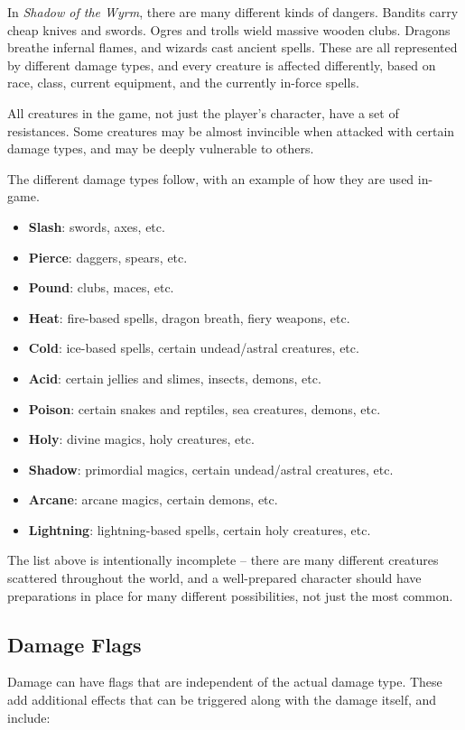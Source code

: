 In {\it Shadow of the Wyrm}, there are many different kinds of dangers.  
Bandits carry cheap knives and swords.  Ogres and trolls wield massive
wooden clubs.  Dragons breathe infernal flames, and wizards cast ancient 
spells.  These are all represented by different damage types, and every 
creature is affected differently, based on race, class, current equipment, 
and the currently in-force spells.

All creatures in the game, not just the player's character, have a set of 
resistances.  Some creatures may be almost invincible when attacked with
certain damage types, and may be deeply vulnerable to others.

The different damage types follow, with an example of how they are used
in-game.

\begin{itemize}
\item {\bf Slash}: swords, axes, etc.
\item {\bf Pierce}: daggers, spears, etc.
\item {\bf Pound}: clubs, maces, etc.
\item {\bf Heat}: fire-based spells, dragon breath, fiery weapons, etc.
\item {\bf Cold}: ice-based spells, certain undead/astral creatures, etc.
\item {\bf Acid}: certain jellies and slimes, insects, demons, etc.
\item {\bf Poison}: certain snakes and reptiles, sea creatures, demons, etc.
\item {\bf Holy}: divine magics, holy creatures, etc.
\item {\bf Shadow}: primordial magics, certain undead/astral creatures, etc.
\item {\bf Arcane}: arcane magics, certain demons, etc.
\item {\bf Lightning}: lightning-based spells, certain holy creatures, etc.
\end{itemize}

The list above is intentionally incomplete -- there are many different
creatures scattered throughout the world, and a well-prepared character 
should have preparations in place for many different possibilities, not 
just the most common.

\subsection{Damage Flags}

Damage can have flags that are independent of the actual damage type.
These add additional effects that can be triggered along with the damage
itself, and include:


